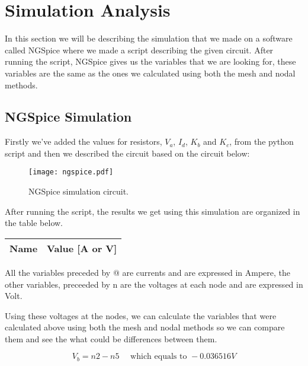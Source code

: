 \section{Simulation Analysis}
\label{sec:simulation}

In this section we will be describing the simulation that we made on a software called NGSpice where we made a script describing the given circuit. After running the script, NGSpice gives us the variables that we are looking for, these variables are the same as the ones we calculated using both the mesh and nodal methods.

\subsection{NGSpice Simulation}

Firstly we’ve added the values for resistors, $V_a$, $I_d$, $K_b$ and $K_c$, from the python script and then we described the circuit based on the circuit below:

\begin{figure}[H] \centering
\texttt{[image: ngspice.pdf]}
\caption{NGSpice simulation circuit.}
\label{fig:ngspice}
\end{figure}


After running the script, the results we get using this simulation are organized in the table below.

\begin{table}[H]
  \centering
  \begin{tabular}{|l|r|}
    \hline    
    {\bf Name} & {\bf Value [A or V]} \\ \hline
    
  \end{tabular}
  \label{tab:op}
\end{table}

All the variables preceded by @ are currents and are expressed in Ampere, the other variables, preceeded by n are the voltages at each node and are expressed in Volt. \par
Using these voltages at the nodes, we can calculate the variables that were calculated above using both the mesh and nodal methods so we can compare them and see the what could be differences between them. \par

\begin{equation}
  V_b = n2 - n5 \quad \text{ which equals to } -0.036516V
  \label{eq18}
\end{equation}


